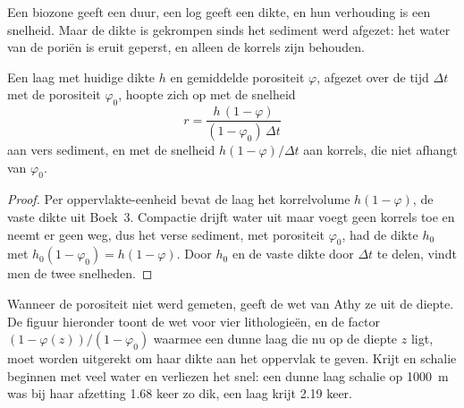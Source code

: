 Een biozone geeft een duur, een log geeft een dikte, en hun verhouding is een snelheid. Maar de
dikte is gekrompen sinds het sediment werd afgezet: het water van de poriën is eruit
geperst, en alleen de korrels zijn behouden.

\begin{proposition}\label{prop:b2:palaeoenvironments:rate}
Een laag met huidige dikte $h$ en gemiddelde porositeit $\varphi$, afgezet over de tijd $\Delta t$
met de porositeit $\varphi_0$, hoopte zich op met de snelheid
\[
  r = \frac{h\,(1 - \varphi)}{(1 - \varphi_0)\,\Delta t}
\]
aan vers sediment, en met de snelheid $h(1-\varphi)/\Delta t$ aan korrels, die niet afhangt van
$\varphi_0$.
\end{proposition}

\begin{proof}
Per oppervlakte-eenheid bevat de laag het korrelvolume $h(1 - \varphi)$, de vaste dikte uit
Boek~3. Compactie drijft water uit maar voegt geen korrels toe en neemt er geen weg, dus het verse
sediment, met porositeit $\varphi_0$, had de dikte $h_0$ met $h_0(1 - \varphi_0) = h(1 -
\varphi)$. Door $h_0$ en de vaste dikte door $\Delta t$ te delen, vindt men de twee snelheden.
\end{proof}

Wanneer de porositeit niet werd gemeten, geeft de wet van Athy ze uit de diepte. De figuur hieronder toont
de wet voor vier lithologieën, en de factor $(1 - \varphi(z))/(1 - \varphi_0)$ waarmee een dunne
laag die nu op de diepte $z$ ligt, moet worden uitgerekt om haar dikte aan het oppervlak te geven. Krijt en schalie
beginnen met veel water en verliezen het snel: een dunne laag schalie op \qty{1000}{m} was bij haar afzetting 1.68 keer
zo dik, een laag krijt 2.19 keer.

